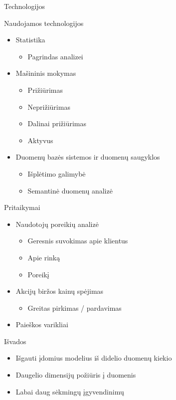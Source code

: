 \documentclass{beamer}
\begin{document}
    \begin{frame}{Technologijos}

        Naudojamos technologijos

        \begin{itemize}
            \item Statistika
                \begin{itemize}
                    \item Pagrindas analizei
                \end{itemize}
            \item Mašininis mokymas
                \begin{itemize}
                    \item Prižiūrimas
                    \item Neprižiūrimas
                    \item Dalinai prižiūrimas
                    \item Aktyvus
                \end{itemize}
            \item Duomenų bazės sistemos ir duomenų saugyklos
                \begin{itemize}
                    \item Išplėtimo galimybė
                    \item Semantinė duomenų analizė
                \end{itemize}
        \end{itemize}

    \end{frame}

    \begin{frame}{Pritaikymai}

        \begin{itemize}
            \item Naudotojų poreikių analizė
                \begin{itemize}
                    \item Geresnis suvokimas apie klientus
                    \item Apie rinką
                    \item Poreikį
                \end{itemize}
            \item Akcijų biržos kainų spėjimas
                \begin{itemize}
                    \item Greitas pirkimas / pardavimas
                \end{itemize}
            \item Paieškos varikliai
        \end{itemize}

    \end{frame}

    \begin{frame}{Išvados}

        \begin{itemize}
            \item Išgauti įdomius modelius iš didelio duomenų kiekio
            \item Daugelio dimensijų požiūris į duomenis
            \item Labai daug sėkmingų įgyvendinimų
        \end{itemize}

    \end{frame}
\end{document}
